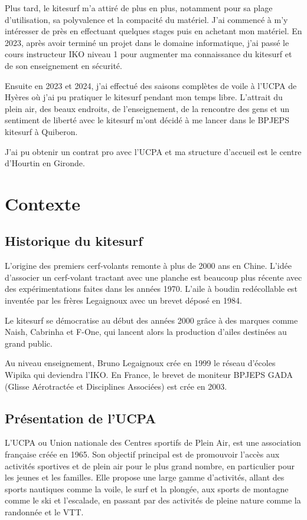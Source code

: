 \documentclass[11pt,a4paper]{report}
\begin{document}
Plus tard, le kitesurf m'a attiré de plus en plus, 
notamment pour sa plage d'utilisation, sa polyvalence et la 
compacité du matériel. J'ai commencé à m'y intéresser de pr\`es en 
effectuant quelques stages puis en achetant mon matériel.
En 2023, après avoir terminé un projet
dans le domaine informatique, j'ai passé le cours instructeur
IKO\cite{iko} niveau 1 pour augmenter ma connaissance du kitesurf
et de son enseignement en sécurité.

Ensuite en 2023 et 2024, j'ai effectué des saisons complètes de voile
à l'UCPA\cite{ucpa} de Hyères o\`u j'ai pu pratiquer le kitesurf
pendant mon temps libre. L'attrait du plein air, des beaux endroits,
de l'enseignement, de la rencontre des gens et un sentiment de liberté
avec le kitesurf  m'ont décidé à me lancer dans le BPJEPS kitesurf 
à Quiberon.

J'ai  pu obtenir un contrat pro avec l'UCPA et 
ma structure d'accueil est le centre d'Hourtin en Gironde.

\section{Contexte}
\subsection{Historique du kitesurf}

L'origine des premiers cerf-volants remonte à plus de 2000 ans en Chine.
L'idée d'associer un cerf-volant tractant avec une planche est beaucoup
plus récente avec des expérimentations  faites 
dans les années 1970. L'aile à boudin redécollable est inventée 
par les frères Legaignoux avec un brevet déposé en 1984\cite{brevet_kite}.

Le kitesurf se démocratise au début des années 2000 grâce à des
marques comme Naish, Cabrinha et F-One, qui lancent alors la 
production d’ailes destinées au grand public.

Au niveau enseignement, Bruno Legaignoux crée en 1999 le
réseau d'écoles Wipika qui deviendra l'IKO\cite{iko}.
En France, le brevet de moniteur BPJEPS GADA (Glisse Aérotractée 
et Disciplines Associées) est crée en 2003.

\subsection{Présentation de l'UCPA}

L'UCPA ou Union nationale des Centres sportifs de Plein Air, est une association
française créée en 1965. Son objectif principal est
de promouvoir l'accès aux activités sportives et de plein air pour le plus grand
nombre, en particulier pour les jeunes et les familles. Elle propose une large
gamme d'activités, allant des sports nautiques comme la voile, le surf et la plongée,
aux sports de montagne comme le ski et l'escalade, en passant par des activités de
pleine nature comme la randonnée et le VTT.
\end{document}
